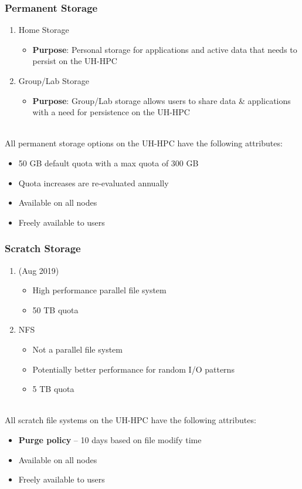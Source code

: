 \begin{frame}
  \frametitle{Permanent Storage}
  \begin{enumerate}
  \item Home Storage
    \begin{itemize}
    \item {\textbf{Purpose}}: Personal storage for applications and active data that needs to persist on the UH-HPC
    \end{itemize}
  \item Group/Lab Storage
    \begin{itemize}
    \item {\textbf{Purpose}}: Group/Lab storage allows users to share data \& applications with a need for persistence on the UH-HPC
    \end{itemize}
  \end{enumerate}
~\\
  All permanent storage options on the UH-HPC have the following attributes:
  \begin{itemize}
  \item 50 GB default quota with a max quota of 300 GB
  \item Quota increases are re-evaluated annually
  \item Available on all nodes
  \item Freely available to users
  \end{itemize}

\end{frame}


\begin{frame}
  \frametitle{Scratch Storage}
  \begin{enumerate}
    \item {\lustre (Aug 2019)}
      \begin{itemize}
      \item High performance parallel file system 
      \item 50 TB quota
      \end{itemize}
    \item NFS
      \begin{itemize}
      \item Not a parallel file system
      \item Potentially better performance for random I/O patterns
      \item 5 TB quota
      \end{itemize}
  \end{enumerate}
~\\
  All scratch file systems on the UH-HPC have the following attributes:
  \begin{itemize}
  \item \textbf{Purge policy} -- 10 days based on file modify time
  \item Available on all nodes
  \item Freely available to users
  \end{itemize}

\end{frame}



